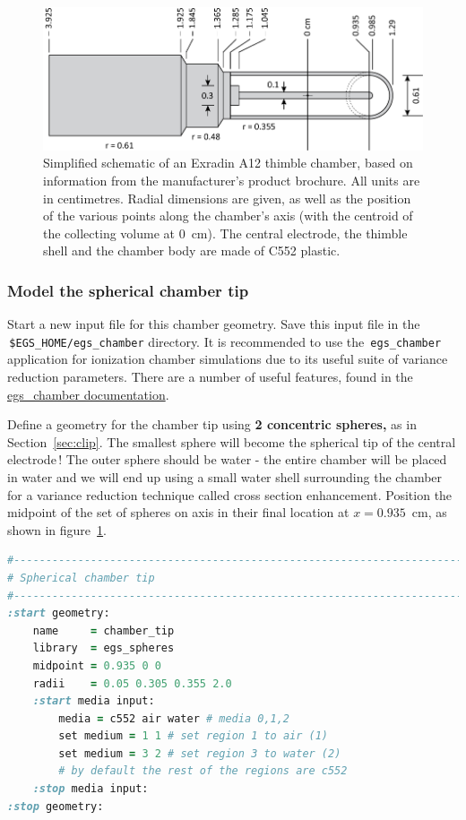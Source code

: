 \documentclass[12pt,twoside]{article}
\begin{document}
\begin{figure}[ht]
\includegraphics[width=\textwidth]{figures/a12}
\caption{\label{fig:a12}Simplified schematic of an Exradin A12 thimble chamber,
based on information from the manufacturer's product brochure. All units are in
centimetres. Radial dimensions are given, as well as the position of the various
points along the chamber's axis (with the centroid of the collecting volume at
0~cm). The central electrode, the thimble shell and the chamber body are made of
C552 plastic.} \end{figure}

\subsubsection{Model the spherical chamber tip}

Start a new input file for this chamber geometry. Save this input file in
the \\
\,\Verb|$EGS_HOME/egs_chamber| directory. It is recommended to use the
\,\Verb|egs_chamber| application for ionization chamber simulations due to
its useful suite of variance reduction parameters. There are a number of
useful features, found in the \href{http://nrc-cnrc.github.io/EGSnrc/doc/pirs898/egs_chamber.html}{egs\_chamber documentation}.

Define a geometry for the
chamber tip using \textbf{2 concentric spheres,} as in Section~\ref{sec:clip}.
The smallest sphere will become the spherical tip of the central electrode\,!
The outer sphere should be water - the entire chamber will be placed in water
and we will end up using a small water shell surrounding the chamber for a
variance reduction technique called cross section enhancement.
Position the midpoint of the set of spheres on axis in their final location at
$x=0.935$~cm, as shown in figure~\ref{fig:a12}.

{\small
\begin{lstlisting}[language=ruby,backgroundcolor=\color{white}]
#-------------------------------------------------------------------------
# Spherical chamber tip
#-------------------------------------------------------------------------
:start geometry:
    name     = chamber_tip
    library  = egs_spheres
    midpoint = 0.935 0 0
    radii    = 0.05 0.305 0.355 2.0
    :start media input:
        media = c552 air water # media 0,1,2
        set medium = 1 1 # set region 1 to air (1)
        set medium = 3 2 # set region 3 to water (2)
        # by default the rest of the regions are c552
    :stop media input:
:stop geometry:
\end{lstlisting}
}
\end{document}
